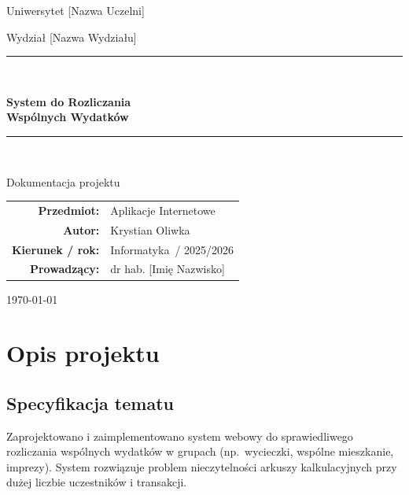 \documentclass[12pt,a4paper]{report}
\newcommand{\autor}{Krystian Oliwka}
\newcommand{\przedmiot}{Aplikacje Internetowe}
\newcommand{\kierunek}{Informatyka}
\newcommand{\rok}{2025/2026}
\newcommand{\prowadzacy}{dr hab. [Imi\k{e} Nazwisko]}
\begin{document}
\begin{titlepage}
    \centering
    \vspace*{1cm}
    {\Large Uniwersytet [Nazwa Uczelni]\par}
    \vspace{0.4cm}
    {\large Wydzia\l{} [Nazwa Wydzia\l{}u]\par}
    \vspace{2.5cm}

    \rule{\linewidth}{1.2pt}\\[0.6cm]
    {\Huge\bfseries\color{primary} System do Rozliczania\\[0.2cm] Wsp\'olnych Wydatk\'ow\par}
    \rule{\linewidth}{1.2pt}\\[1.5cm]

    {\LARGE Dokumentacja projektu\par}
    \vspace{2cm}

    \begin{tabular}{rl}
        \textbf{Przedmiot:}      & \przedmiot \\
        \textbf{Autor:}          & \autor \\
        \textbf{Kierunek / rok:} & \kierunek\ / \rok \\
        \textbf{Prowadz\k{a}cy:} & \prowadzacy \\
    \end{tabular}

    \vfill
    {\large \today\par}
\end{titlepage}

\tableofcontents
\clearpage
{}

\chapter{Opis projektu}

\section{Specyfikacja tematu}

Zaprojektowano i zaimplementowano system webowy do sprawiedliwego rozliczania wsp\'olnych wydatk\'ow w grupach (np.\ wycieczki, wsp\'olne mieszkanie, imprezy). System rozwi\k{a}zuje problem nieczytelno\'sci arkuszy kalkulacyjnych przy du\.zej liczbie uczestnik\'ow i transakcji.
\end{document}
